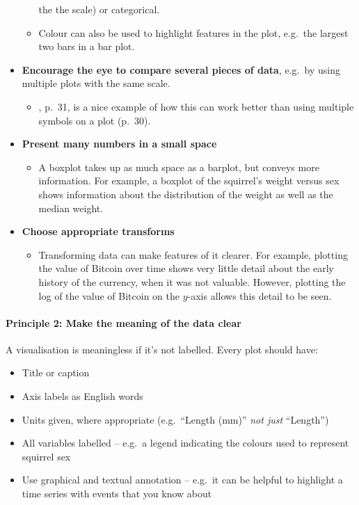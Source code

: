 \documentclass[10pt]{article}
\begin{document}
\begin{multicols}{3}
\begin{itemize}
\begin{itemize}
    the the scale) or categorical.
  \item Colour can also be used to highlight features in the plot,
    e.g.~the largest two bars in a bar plot.
  \end{itemize}
\item \textbf{Encourage the eye to compare several pieces of data}, e.g.~by
  using multiple plots with the same scale.
  \begin{itemize}
  \item \citet{WexlEtal17big}, p.~31, is a nice example of how this
    can work better than using multiple symbols on a plot (p.~30).
  \end{itemize}

\item \textbf{Present many numbers in a small space}
  \begin{itemize}
  \item A boxplot takes up as much space as a barplot, but conveys
    more information. For example, a boxplot of the squirrel's weight
    versus sex shows information about the distribution of the weight
    as well as the median weight.
  \end{itemize}
\item \textbf{Choose appropriate transforms}
  \begin{itemize}
  \item Transforming data can make features of it clearer. For
    example, plotting the value of Bitcoin over time shows very little
    detail about the early history of the currency, when it was not
    valuable. However, plotting the log of the value of Bitcoin on the
    $y$-axis allows this detail to be seen.
  \end{itemize}
\end{itemize}


\paragraph{Principle 2:  Make the meaning of the data clear}

A visualisation is meaningless if it's not labelled. Every plot should have:
\begin{itemize}
\item Title or caption
\item Axis labels as English words
\item Units given, where appropriate (e.g.~``Length (mm)''
  \emph{not just} ``Length'')
\item All variables labelled -- e.g.~a legend indicating the colours
  used to represent squirrel sex
\item Use graphical and textual annotation -- e.g.~it can be helpful to
  highlight a time series with events that you know about
\end{itemize}


\end{multicols}
\end{document}
